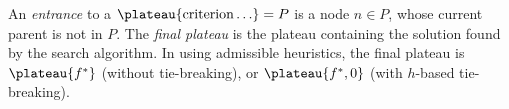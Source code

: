 An \emph{entrance} to a $\plateau{\text{criterion}\ldots}=P$ is
a node $n \in P$, whose current parent is not in
$P$. The \emph{final plateau} is the plateau
containing the solution found by the search algorithm.  In \astar using
admissible heuristics, the final plateau is $\plateau{f^*}$ (without
tie-breaking), or $\plateau{f^*,0}$ (with $h$-based tie-breaking).
